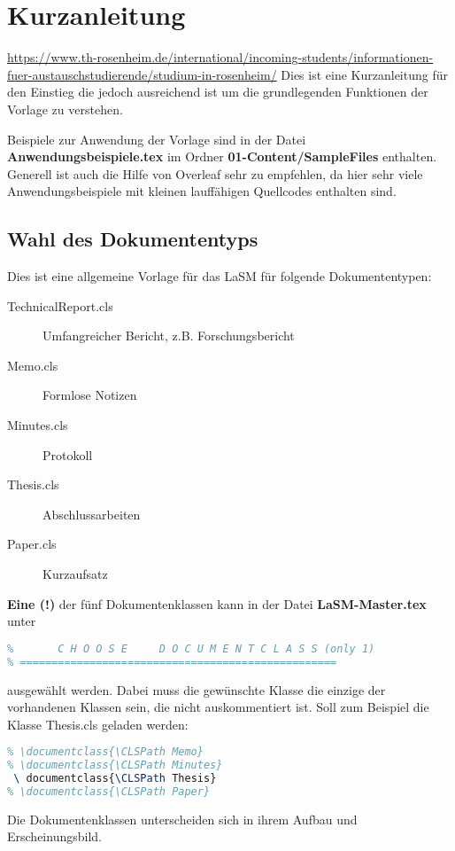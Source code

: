 \newpage
\section{Kurzanleitung}
\label{sec:Kurzanleitung}
\url{https://www.th-rosenheim.de/international/incoming-students/informationen-fuer-austauschstudierende/studium-in-rosenheim/}
Dies ist eine Kurzanleitung für den Einstieg die jedoch ausreichend ist um die grundlegenden Funktionen der Vorlage zu verstehen.
\par
Beispiele zur Anwendung der Vorlage sind in der Datei \textbf{Anwendungsbeispiele.tex} im Ordner \textbf{01-Content/SampleFiles} enthalten.
Generell ist auch die Hilfe von Overleaf sehr zu empfehlen, da hier sehr viele Anwendungsbeispiele mit kleinen lauffähigen Quellcodes enthalten sind.
%
\subsection{Wahl des Dokumententyps}
Dies ist eine allgemeine Vorlage für das \ac{LaSM} für folgende Dokumententypen:
\begin{description}
    \item[TechnicalReport.cls] Umfangreicher Bericht, z.B. Forschungsbericht
    \item[Memo.cls] Formlose Notizen
    \item[Minutes.cls] Protokoll
    \item[Thesis.cls] Abschlussarbeiten
    \item[Paper.cls] Kurzaufsatz
\end{description}
\textbf{Eine (!)} der fünf Dokumentenklassen kann in der Datei \textbf{LaSM-Master.tex} unter
\begin{lstlisting}[language=tex]
% ==================================================
%       C H O O S E     D O C U M E N T C L A S S (only 1)
% ==================================================    
\end{lstlisting}
ausgewählt werden. 
Dabei muss die gewünschte Klasse die einzige der vorhandenen Klassen sein, die nicht auskommentiert ist.
Soll zum Beispiel die Klasse Thesis.cls geladen werden:
\begin{lstlisting}[language=tex]
% \documentclass{\CLSPath TechnicalReport}
% \documentclass{\CLSPath Memo}
% \documentclass{\CLSPath Minutes}
 \ documentclass{\CLSPath Thesis}
% \documentclass{\CLSPath Paper}
\end{lstlisting}
Die Dokumentenklassen unterscheiden sich in ihrem Aufbau und Erscheinungsbild. 
